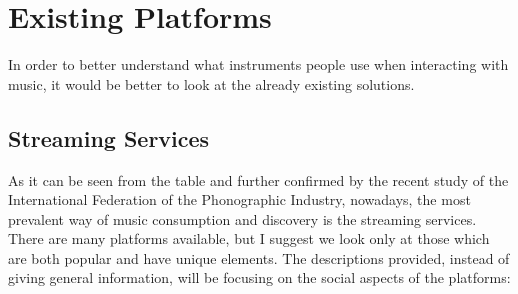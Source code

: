\chapter{Existing Platforms}
In order to better understand what instruments people use when interacting with music, it would be better
to look at the already existing solutions.


\section{Streaming Services}
As it can be seen from the table and further confirmed by
the recent study of the International Federation of the Phonographic Industry\cite{music_stats_2024},
nowadays, the most prevalent way of music consumption
and discovery is the streaming services. There are many platforms available,
but I suggest we look only at those which are both popular and have unique elements.
The descriptions provided, instead of giving general information,
will be focusing on the social aspects of the platforms:

